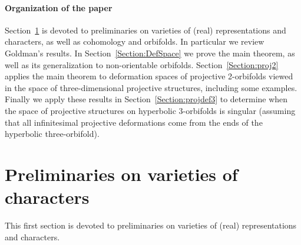 \documentclass[a4paper,11pt]{article}
\begin{document}
\paragraph{Organization of the paper}
Section~\ref{Section:prelim} is devoted to preliminaries on
varieties of (real) representations and characters, as well as cohomology and orbifolds. In particular we review Goldman's results.
In Section~\ref{Section:DefSpace} we prove the main theorem, 
as well as its generalization to non-orientable orbifolds.
Section~\ref{Section:proj2} applies the main theorem to deformation spaces of
projective 2-orbifolds viewed in the space of three-dimensional projective
structures, including some examples.
 Finally we apply these results in
Section~\ref{Section:projdef3} to determine when the space of projective structures on hyperbolic 3-orbifolds is singular (assuming that
all infinitesimal projective deformations come from the ends of the hyperbolic three-orbifold).



\section{Preliminaries on varieties of characters}
\label{Section:prelim}

This first section is devoted to preliminaries on varieties of (real) representations and characters.
\end{document}
